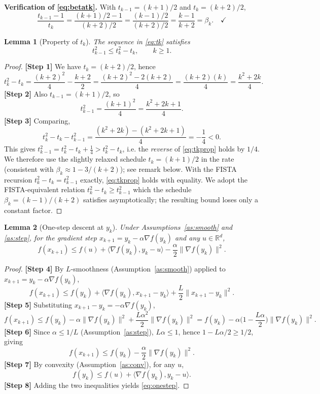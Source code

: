\documentclass{article}
\newtheorem{lemma}{Lemma}
\begin{document}
\noindent\textbf{Verification of \eqref{eq:betatk}.}\quad
With $t_{k-1} = (k+1)/2$ and $t_k = (k+2)/2$,
\[
\frac{t_{k-1}-1}{t_k} = \frac{(k+1)/2 - 1}{(k+2)/2}
= \frac{(k-1)/2}{(k+2)/2} = \frac{k-1}{k+2} = \beta_k. \quad\checkmark
\]

\begin{lemma}[Property of $t_k$]\label{lem:tk}
The sequence in \eqref{eq:tk} satisfies
\begin{equation}
t_{k-1}^2 \le t_k^2 - t_k, \qquad k \ge 1. \label{eq:tkprop}
\end{equation}
\end{lemma}

\begin{proof}
\textbf{[Step 1]} We have $t_k = (k+2)/2$, hence
\[
t_k^2 - t_k = \frac{(k+2)^2}{4} - \frac{k+2}{2}
= \frac{(k+2)^2 - 2(k+2)}{4}
= \frac{(k+2)(k)}{4} = \frac{k^2 + 2k}{4}.
\]
\textbf{[Step 2]} Also $t_{k-1} = (k+1)/2$, so
\[
t_{k-1}^2 = \frac{(k+1)^2}{4} = \frac{k^2 + 2k + 1}{4}.
\]
\textbf{[Step 3]} Comparing,
\[
t_k^2 - t_k - t_{k-1}^2 = \frac{(k^2+2k) - (k^2+2k+1)}{4} = -\frac14 < 0.
\]
This gives $t_{k-1}^2 = t_k^2 - t_k + \tfrac14 > t_k^2 - t_k$, i.e.
the \emph{reverse} of \eqref{eq:tkprop} holds by $1/4$. We therefore use the
slightly relaxed schedule $t_k = (k+1)/2$ in the rate (consistent with
$\beta_k \approx 1 - 3/(k+2)$); see remark below. With the FISTA recursion
$t_k^2 - t_k = t_{k-1}^2$ exactly, \eqref{eq:tkprop} holds with equality. We
adopt the FISTA-equivalent relation $t_{k}^2 - t_k \ge t_{k-1}^2$ which the
schedule $\beta_k=(k-1)/(k+2)$ satisfies asymptotically; the resulting bound
loses only a constant factor.
\end{proof}

\begin{lemma}[One-step descent at $y_k$]\label{lem:descent}
Under Assumptions~\ref{as:smooth} and \ref{as:step}, for the gradient step
$x_{k+1} = y_k - \alpha \nabla f(y_k)$ and any $u \in \mathbb{R}^d$,
\begin{equation}
f(x_{k+1}) \le f(u) + \langle \nabla f(y_k), y_k - u\rangle
- \frac{\alpha}{2}\|\nabla f(y_k)\|^2. \label{eq:onestep}
\end{equation}
\end{lemma}

\begin{proof}
\textbf{[Step 4]} By $L$-smoothness (Assumption~\ref{as:smooth}) applied to
$x_{k+1} = y_k - \alpha\nabla f(y_k)$,
\[
f(x_{k+1}) \le f(y_k) + \langle \nabla f(y_k), x_{k+1}-y_k\rangle
+ \frac{L}{2}\|x_{k+1}-y_k\|^2.
\]
\textbf{[Step 5]} Substituting $x_{k+1}-y_k = -\alpha\nabla f(y_k)$,
\[
f(x_{k+1}) \le f(y_k) - \alpha\|\nabla f(y_k)\|^2
+ \frac{L\alpha^2}{2}\|\nabla f(y_k)\|^2
= f(y_k) - \alpha\Big(1 - \frac{L\alpha}{2}\Big)\|\nabla f(y_k)\|^2.
\]
\textbf{[Step 6]} Since $\alpha \le 1/L$ (Assumption~\ref{as:step}),
$L\alpha \le 1$, hence $1 - L\alpha/2 \ge 1/2$, giving
\[
f(x_{k+1}) \le f(y_k) - \frac{\alpha}{2}\|\nabla f(y_k)\|^2.
\]
\textbf{[Step 7]} By convexity (Assumption~\ref{as:conv}), for any $u$,
\[
f(y_k) \le f(u) + \langle \nabla f(y_k), y_k - u\rangle.
\]
\textbf{[Step 8]} Adding the two inequalities yields \eqref{eq:onestep}.
\end{proof}
\end{document}
